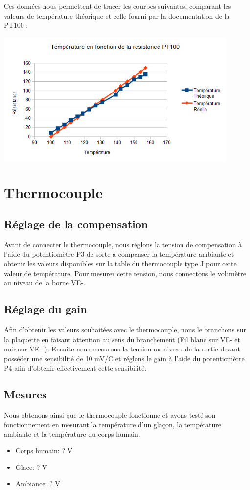 \documentclass[a4paper,12pt]{article}
\begin{document}
      \par Ces données nous permettent de tracer les courbes suivantes, comparant les valeurs de température théorique et celle fourni par la documentation de la PT100 :
			\begin{center}
				\includegraphics[width=12cm]{../Images/GraphPT100.png}
			\end{center}
    \newpage

  \section{Thermocouple}
		\subsection{Réglage de la compensation}
			\par Avant de connecter le thermocouple, nous réglons la tension de compensation à l'aide du potentiomètre P3 de sorte à compenser la température ambiante et obtenir les valeurs disponibles sur la table du thermocouple type J pour cette valeur de température. Pour mesurer cette tension, nous connectons le voltmètre au niveau de la borne VE-.

		\subsection{Réglage du gain}
			\par Afin d'obtenir les valeurs souhaitées avec le thermocouple, nous le branchons sur la plaquette en faisant attention au sens du branchement (Fil blanc sur VE- et noir sur VE+). Ensuite nous mesurons la tension au niveau de la sortie devant posséder une sensibilité de 10 mV/{\degre}C et réglons le gain à l'aide du potentiomètre P4 afin d'obtenir effectivement cette sensibilité.

		\subsection{Mesures}
			\par Nous obtenons ainsi que le thermocouple fonctionne et avons testé son fonctionnement en mesurant la température d'un glaçon, la température ambiante et la température du corps humain.
      		\begin{itemize}
				\item Corps humain: ? V
				\item Glace: ? V
				\item Ambiance: ? V
			\end{itemize}
\end{document}
